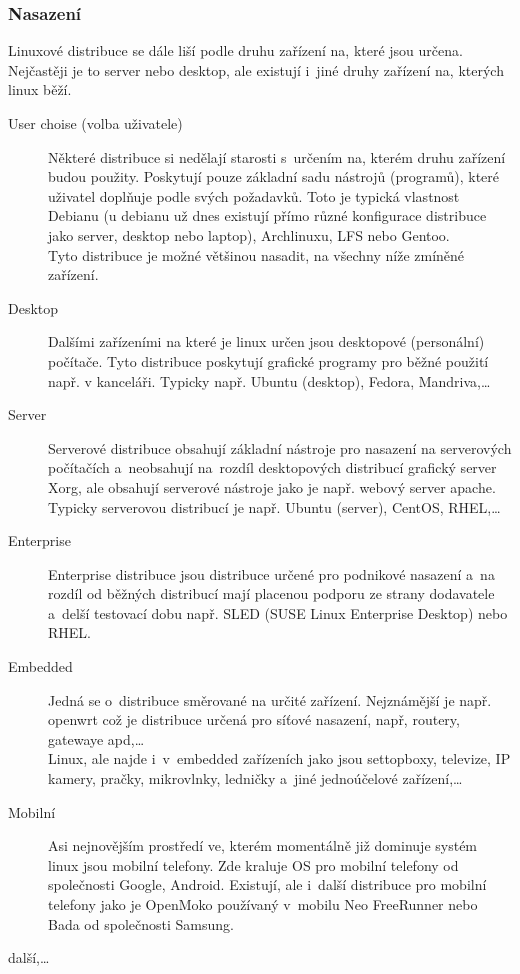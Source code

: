 \documentclass[a4paper,12pt]{article}
\begin{document}
\subsubsection{Nasazení}
Linuxové distribuce se dále liší podle druhu zařízení na, které jsou určena. Nejčastěji je to server nebo desktop, ale existují i~jiné druhy zařízení na, kterých linux běží.
\begin{description}
 \item[User choise (volba uživatele)] Některé distribuce si nedělají starosti s~určením na, kterém druhu zařízení budou použity. Poskytují pouze základní sadu nástrojů (programů), které uživatel doplňuje podle svých požadavků. Toto je typická vlastnost Debianu (u debianu už dnes existují přímo různé konfigurace distribuce jako server, desktop nebo laptop), Archlinuxu, LFS nebo Gentoo.\\
Tyto distribuce je možné většinou nasadit, na všechny níže zmíněné zařízení.
 \item[Desktop] Dalšími zařízeními na které je linux určen jsou desktopové (personální) počítače. Tyto distribuce poskytují grafické programy pro běžné použití např. v kanceláři. Typicky např. Ubuntu (desktop), Fedora, Mandriva,…
 \item[Server] Serverové distribuce obsahují základní nástroje pro nasazení na serverových počítačích a~neobsahují na~rozdíl desktopových distribucí grafický server Xorg, ale obsahují serverové nástroje jako je např. webový server apache. Typicky serverovou distribucí je např. Ubuntu (server), CentOS, RHEL,…
 \item[Enterprise] Enterprise distribuce jsou distribuce určené pro podnikové nasazení a~na rozdíl od běžných distribucí mají placenou podporu ze strany dodavatele a~delší testovací dobu např. SLED (SUSE Linux Enterprise Desktop) nebo RHEL.
 \item[Embedded] Jedná se o~distribuce směrované na určité zařízení. Nejznámější je např. openwrt což je distribuce určená pro síťové nasazení, např, routery, gatewaye apd,…\\
Linux, ale najde i~v~embedded zařízeních jako jsou settopboxy, televize, IP kamery, pračky, mikrovlnky, ledničky a~jiné jednoúčelové zařízení,…
 \item[Mobilní] Asi nejnovějším prostředí ve, kterém momentálně již dominuje systém linux jsou mobilní telefony. Zde kraluje OS pro mobilní telefony od společnosti Google, Android. Existují, ale i~další distribuce pro mobilní telefony jako je OpenMoko používaný v~mobilu Neo FreeRunner nebo Bada od společnosti Samsung.
 \item[další,…] 
 \end{description}
\end{document}
